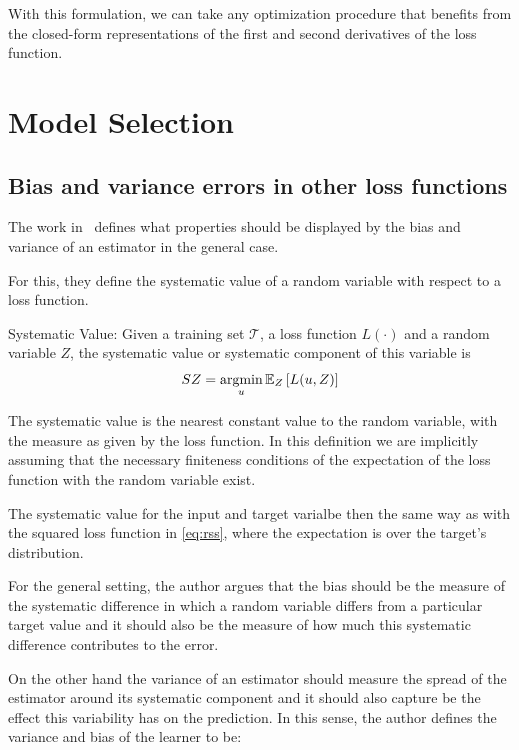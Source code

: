 \begin{appendices}
With this formulation, we can take any optimization procedure that benefits from the closed-form representations of the first and second derivatives of the loss function.



\chapter{Model Selection}

\section{Bias and variance errors in other loss functions}\label{appx:sec:biasVarianceExtensionLoss}

The work in~\cite{james-biasVarianceGeneral} defines what properties should be displayed by the bias and variance of an estimator in the general case.

For this, they define the systematic value of a random variable with respect to a loss function.


\begin{definition}{Systematic Value:}
Given a training set $\mathcal{T}$, a loss function $L(\cdot)$ and a random variable $Z$, the systematic value or systematic component of this variable is
$$ SZ =  \operatorname*{argmin}_u \operatorname{\mathbb{E}}_{Z} \left[ L(u,Z) \right]$$
\end{definition}

The systematic value is the nearest constant value to the random variable, with the measure as given by the loss function.
In this definition we are implicitly assuming that the necessary finiteness conditions of the expectation of the loss function with the random variable exist.

The systematic value for the input and target varialbe then the same way as with the squared loss function in \cref{eq:rss}, where the expectation is over the target's distribution.

For the general setting, the author argues that the bias should be the measure of the systematic difference in which a random variable differs from a particular target value and it should also be the measure of how much this systematic difference contributes to the error.

On the other hand the variance of an estimator should measure the spread of the estimator around its systematic component and it should also capture be the effect this variability has on the prediction.
In this sense, the author defines the variance and bias of the learner to be:


\end{appendices}
